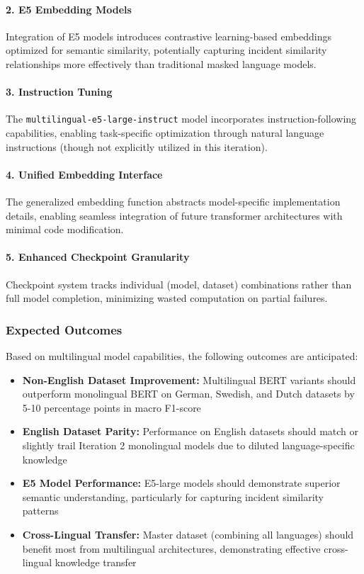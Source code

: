\documentclass[11pt, titlepage, bibliography=totoc]{scrreprt}
\begin{document}
\paragraph{2. E5 Embedding Models}
Integration of E5 models introduces contrastive learning-based embeddings optimized for semantic similarity, potentially capturing incident similarity relationships more effectively than traditional masked language models.

\paragraph{3. Instruction Tuning}
The \texttt{multilingual-e5-large-instruct} model incorporates instruction-following capabilities, enabling task-specific optimization through natural language instructions (though not explicitly utilized in this iteration).

\paragraph{4. Unified Embedding Interface}
The generalized embedding function abstracts model-specific implementation details, enabling seamless integration of future transformer architectures with minimal code modification.

\paragraph{5. Enhanced Checkpoint Granularity}
Checkpoint system tracks individual (model, dataset) combinations rather than full model completion, minimizing wasted computation on partial failures.

\subsubsection{Expected Outcomes}

Based on multilingual model capabilities, the following outcomes are anticipated:

\begin{itemize}
    \item \textbf{Non-English Dataset Improvement:} Multilingual BERT variants should outperform monolingual BERT on German, Swedish, and Dutch datasets by 5-10 percentage points in macro F1-score
    \item \textbf{English Dataset Parity:} Performance on English datasets should match or slightly trail Iteration 2 monolingual models due to diluted language-specific knowledge
    \item \textbf{E5 Model Performance:} E5-large models should demonstrate superior semantic understanding, particularly for capturing incident similarity patterns
    \item \textbf{Cross-Lingual Transfer:} Master dataset (combining all languages) should benefit most from multilingual architectures, demonstrating effective cross-lingual knowledge transfer
\end{itemize}
\end{document}
